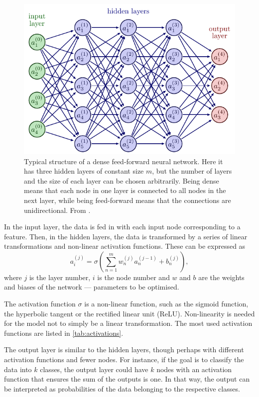 \begin{figure}
    \centering
    \includegraphics[width=0.7\linewidth, page=4]{neural_networks.pdf}
    \caption{
        Typical structure of a dense feed-forward neural network.
        Here it has three hidden layers of constant size $m$, but the number of layers and the size of each layer can be chosen arbitrarily.
        Being dense means that each node in one layer is connected to all nodes in the next layer, while being feed-forward means that the connections are unidirectional.
        From \cite{nn_figs}.
    }
    \label{fig:nn}
\end{figure}

In the input layer, the data is fed in with each input node corresponding to a feature.
Then, in the hidden layers, the data is transformed by a series of linear transformations and non-linear activation functions.
These can be expressed as
\begin{equation}
    \label{eq:nn}
    a_i^{(j)} = \sigma\left( \sum_{n=1}^m w^{(j)}_n a^{(j-1)}_n + b^{(j)}_n \right),
\end{equation}
where $j$ is the layer number, $i$ is the node number and $w$ and $b$ are the weights and biases of the network — parameters to be optimised.

The activation function $\sigma$ is a non-linear function, such as the sigmoid function, the hyperbolic tangent or the rectified linear unit (ReLU).
Non-linearity is needed for the model not to simply be a linear transformation.
The most used activation functions are listed in \cref{tab:activations}.

The output layer is similar to the hidden layers, though perhaps with different activation functions and fewer nodes.
For instance, if the goal is to classify the data into $k$ classes, the output layer could have $k$ nodes with an activation function that ensures the sum of the outputs is one.
In that way, the output can be interpreted as probabilities of the data belonging to the respective classes.

